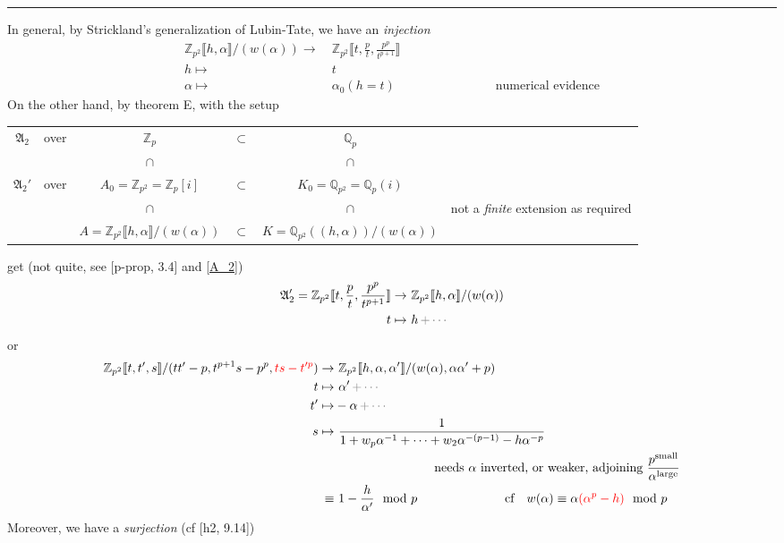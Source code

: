 \documentclass{rs}
\theoremstyle{definition}
\theoremstyle{remark}
\newcommand{\mb}[1]{\mathbb{#1}}
\newcommand{\mf}[1]{\mathfrak{#1}}
\newcommand{\BQ}{{\mb Q}}
\newcommand{\BZ}{{\mb Z}}
\newcommand{\md}{~~{\rm mod}~}
\newcommand{\A}{\alpha}
\newcommand{\lb}{\llbracket}
\newcommand{\rb}{\rrbracket}
\newcommand{\lp}{(\!(}
\newcommand{\rp}{)\!)}
\renewcommand{\=}{\approx}
\renewcommand{\-}{\sim}
\numberwithin{equation}{section}
\numberwithin{thm}{section}
\begin{document}
\hrule

In general, by Strickland's generalization of Lubin-Tate, we have an {\em injection} 
\begin{equation*}
\begin{split}
 \BZ_{p^2} \lb h, \A \rb / (w(\A)) \to & ~ \BZ_{p^2} \lb t, \frac{p}{t}, \frac{p^p}{t^{p+1}} \rb \\
 h \mapsto & ~ t \\
 \A \mapsto & ~ \A_0(h=t) \qquad \qquad \qquad \qquad \text{numerical evidence} 
\end{split}
\end{equation*}
On the other hand, by theorem E, with the setup 

\begin{tabular}{cccccc}
 $\mf A_2$ & over & $\BZ_p$ & $\subset$ & $\BQ_p$ & \\
 && $\cap$ && $\cap$ & \\
 $\mf A_2'$ & over & $A_0 = \BZ_{p^2} = \BZ_p[i]$ & $\subset$ & $K_0 = \BQ_{p^2} = \BQ_p(i)$ & \\
 && $\cap$ && $\cap$ & not a {\em finite} extension as required \\
 && $A = \BZ_{p^2} \lb h, \A \rb / (w(\A))$ & $\subset$ & $K = \BQ_{p^2} \lp h, \A \rp / (w(\A))$ & 
\end{tabular}

get (not quite, see [p-prop, 3.4] and \eqref{A_2}) 
\begin{equation*}
\begin{split}
 {\mf A_2'} = \BZ_{p^2} \lb t, \frac{p}{t}, \frac{p^p}{t^{p+1}} \rb \to & ~ \BZ_{p^2} \lb h, \A \rb / (w(\A)) \\
 t \mapsto & ~ h \textcolor{gray}{\thinspace + \cdots} 
\end{split}
\end{equation*}
or 
\begin{equation*}
\begin{split}
 \BZ_{p^2} \lb t, t', s \rb / (t t' - p, t^{p+1} s - p^p, \textcolor{red}{t s - t'^p}) \to & ~ \BZ_{p^2} \lb h, \A, \A' \rb / (w(\A), \A \A' + p) \\
 t \mapsto & ~ \A' \textcolor{gray}{\thinspace + \cdots} \\
 t' \mapsto & -\A \textcolor{gray}{\thinspace + \cdots} \\
 s \mapsto & ~ \frac{1}{1 + w_p \A^{-1} + \cdots + w_2 \A^{-(p-1)} - h \A^{-p}} \\
 & \qquad \qquad \qquad \qquad \text{needs $\A$ inverted, or weaker, adjoining $\frac{p^\text{small}}{\A^\text{large}}$} \\
 \equiv & ~ 1 - \frac{h}{\A'} \md p \qquad \qquad \qquad \quad \text{cf ~ $w(\A) \equiv \A \textcolor{red}{(\A^p - h)} \md p$} 
\end{split}
\end{equation*}
Moreover, we have a {\em surjection} (cf [h2, 9.14]) 
\end{document}
